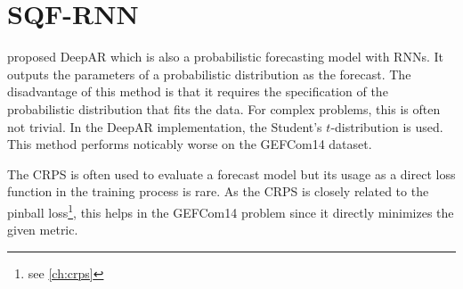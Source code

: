 \section{SQF-RNN}
\label{sec:implementation-sqf-rnn}

\Textcite{Salinas2017} proposed DeepAR which is also a 
probabilistic forecasting model with RNNs. It outputs the 
parameters of a probabilistic distribution as the forecast. 
The disadvantage of this method is that it requires the 
specification of the probabilistic distribution that fits the data. 
For complex problems, this is often not trivial. 
In the DeepAR implementation, the Student's \(t\)-distribution is used. 
This method performs noticably worse on the GEFCom14 dataset. 

The CRPS is often used to evaluate a forecast model but its usage as 
a direct loss function in the training process is rare. 
As the CRPS is closely related to the pinball loss\footnote{see \ref{ch:crps}}, 
this helps in the GEFCom14 problem since it directly minimizes the given metric.
